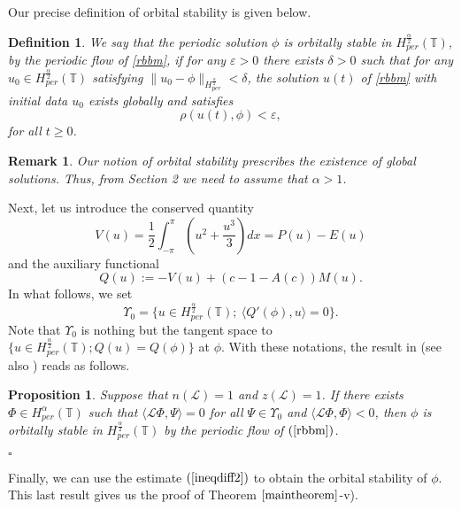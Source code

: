 \documentclass[12pt,reqno]{amsart}
\newcommand{\2}{L^2_{per}(0, T)}
\newtheorem{prop}{Proposition}[section]
\newcommand{\ve}{{\varepsilon}}
\newcommand{\Hper}{{H_{per}^{\frac{\alpha}{2}}(\mathbb{T})}}
\newcommand{\Hn}{{H_{per}^{\frac{\alpha}{2}}}}
\numberwithin{equation}{section}
\numberwithin{figure}{section}
\newtheorem{remark}[theorem]{Remark}
\newtheorem{definition}[theorem]{Definition}
\begin{document}
\indent Our precise definition of orbital stability is given below.\\

\begin{definition}\label{defstab}
	We say that the periodic solution $\phi$ is orbitally stable in $\Hper$, by the periodic flow of \eqref{rbbm},  if for any $\ve>0$ there exists $\delta>0$ such that for any $u_0\in H_{per}^{\frac{\alpha}{2}}(\mathbb{T})$ satisfying $\|u_0-\phi\|_{\Hn}<\delta$, the solution $u(t)$ of \eqref{rbbm} with initial data $u_0$ exists globally and satisfies
	$$
	\rho(u(t),\phi)<\ve,
	$$
	for all $t\geq0$.
\end{definition}
\begin{remark}
	Our notion of orbital stability prescribes the existence of global solutions. Thus, from Section 2 we need to assume that $\alpha>1$.
\end{remark}
\indent Next, let us introduce the conserved quantity
\begin{equation}\label{V}
	V(u)=\frac{1}{2}\int_{-\pi}^{\pi}\left(u^2+\frac{u^3}{3}\right)dx=P(u)-E(u)
\end{equation}
and the auxiliary functional
\begin{equation*}
	Q(u):=-V(u)+(c-1-A(c))M(u).
\end{equation*}
\indent In what follows, we set
\begin{equation*}
	\Upsilon_0=\{u\in \Hper;\ \langle Q'(\phi),u\rangle=0\}.
\end{equation*}
Note that $\Upsilon_0$ is nothing but the tangent space to $\{u\in \Hper;  Q(u)=Q(\phi)\}$ at $\phi$. With these notations, the result in \cite[Theorem 2.1]{CNP} (see also \cite{ANP}) reads as follows.
\medskip
\begin{prop}\label{teoest} Suppose that $n(\mathcal{L})=1$ and $z(\mathcal{L})=1$. If there exists $\Phi\in H_{per}^{\alpha}(\mathbb{T})$ such that $\langle\mathcal{L}\Phi,\Psi\rangle=0$ for all $\Psi\in \Upsilon_0$ and $\langle\mathcal{L}\Phi,\Phi\rangle<0$, then $\phi$ is orbitally stable in $\Hper$ by the periodic flow of   $(\ref{rbbm})$.
\end{prop}

\begin{flushright}
	$\square$
\end{flushright}


\indent Finally, we can use the estimate $(\ref{ineqdiff2})$ to obtain the orbital stability of $\phi$. This last result gives us the proof of Theorem $\ref{maintheorem}$-v).
\end{document}

